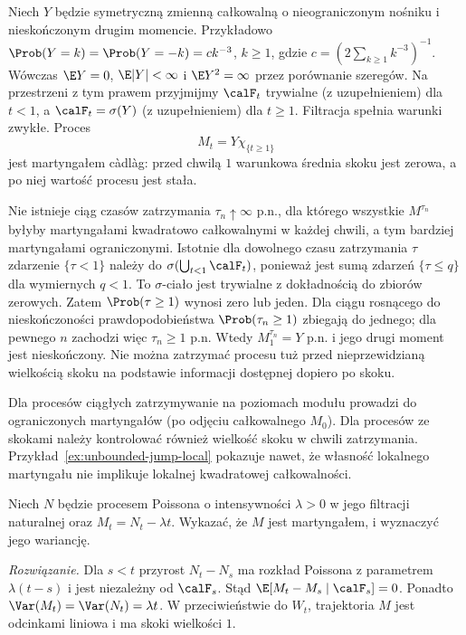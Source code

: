 \begin{przyklad}
\label{ex:unbounded-jump-local}
Niech $Y$ będzie symetryczną zmienną całkowalną
o nieograniczonym nośniku i nieskończonym
drugim momencie. Przykładowo
$\Prob(Y=k)=\Prob(Y=-k)=c k^{-3}$, $k\ge1$,
gdzie $c=(2\sum_{k\ge1}k^{-3})^{-1}$.
Wówczas $\E Y=0$, $\E|Y|<\infty$ i
$\E Y^2=\infty$ przez porównanie szeregów.
Na przestrzeni z tym prawem przyjmijmy
$\calF_t$ trywialne (z uzupełnieniem) dla $t<1$,
a $\calF_t=\sigma(Y)$ (z uzupełnieniem) dla $t\ge1$.
Filtracja spełnia warunki zwykłe.
Proces
\[
M_t=Y\chi_{\{t\ge1\}}
\]
jest martyngałem c\`adl\`ag: przed chwilą $1$
warunkowa średnia skoku jest zerowa, a po niej
wartość procesu jest stała.

Nie istnieje ciąg czasów zatrzymania
$\tau_n\uparrow\infty$ p.n., dla którego
wszystkie $M^{\tau_n}$ byłyby martyngałami
kwadratowo całkowalnymi w każdej chwili,
a tym bardziej martyngałami ograniczonymi.
Istotnie dla dowolnego czasu zatrzymania $\tau$
zdarzenie $\{\tau<1\}$ należy do
$\sigma(\bigcup_{t<1}\calF_t)$, ponieważ
jest sumą zdarzeń $\{\tau\le q\}$ dla wymiernych
$q<1$. To $\sigma$-ciało jest trywialne
z dokładnością do zbiorów zerowych.
Zatem $\Prob(\tau\ge1)$ wynosi zero lub jeden.
Dla ciągu rosnącego do nieskończoności
prawdopodobieństwa $\Prob(\tau_n\ge1)$
zbiegają do jednego; dla pewnego $n$ zachodzi
więc $\tau_n\ge1$ p.n.
Wtedy $M^{\tau_n}_1=Y$ p.n. i jego drugi
moment jest nieskończony.
Nie można zatrzymać procesu tuż przed
nieprzewidzianą wielkością skoku na podstawie
informacji dostępnej dopiero po skoku.
\end{przyklad}

\begin{uwaga}
Dla procesów ciągłych zatrzymywanie na poziomach
modułu prowadzi do ograniczonych martyngałów
(po odjęciu całkowalnego $M_0$).
Dla procesów ze skokami należy kontrolować
również wielkość skoku w chwili zatrzymania.
Przykład~\ref{ex:unbounded-jump-local}
pokazuje nawet, że własność lokalnego
martyngału nie implikuje lokalnej
kwadratowej całkowalności.
\end{uwaga}

\begin{zadanie}
Niech $N$ będzie procesem Poissona o intensywności
$\lambda>0$ w jego filtracji naturalnej
oraz $M_t=N_t-\lambda t$. Wykazać,
że $M$ jest martyngałem, i wyznaczyć jego wariancję.

\emph{Rozwiązanie.} Dla $s<t$ przyrost
$N_t-N_s$ ma rozkład Poissona z parametrem
$\lambda(t-s)$ i jest niezależny od $\calF_s$.
Stąd $\E[M_t-M_s\mid\calF_s]=0$. Ponadto
$\Var(M_t)=\Var(N_t)=\lambda t$.
W przeciwieństwie do $W_t$, trajektoria $M$ jest
odcinkami liniowa i ma skoki wielkości $1$.
\end{zadanie}


